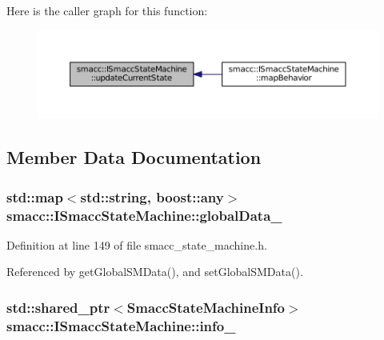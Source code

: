 Here is the caller graph for this function\+:
\nopagebreak
\begin{figure}[H]
\begin{center}
\leavevmode
\includegraphics[width=350pt]{classsmacc_1_1ISmaccStateMachine_aea0936b00b0186e8d4e514af16f69766_icgraph}
\end{center}
\end{figure}




\subsection{Member Data Documentation}
\subsubsection[{\texorpdfstring{global\+Data\+\_\+}{globalData_}}]{\setlength{\rightskip}{0pt plus 5cm}std\+::map$<$std\+::string, boost\+::any$>$ smacc\+::\+I\+Smacc\+State\+Machine\+::global\+Data\+\_\+\hspace{0.3cm}{\ttfamily [private]}}\hypertarget{classsmacc_1_1ISmaccStateMachine_a4af5edfc2584f74409ca194d2d869fac}{}\label{classsmacc_1_1ISmaccStateMachine_a4af5edfc2584f74409ca194d2d869fac}


Definition at line 149 of file smacc\+\_\+state\+\_\+machine.\+h.



Referenced by get\+Global\+S\+M\+Data(), and set\+Global\+S\+M\+Data().

\subsubsection[{\texorpdfstring{info\+\_\+}{info_}}]{\setlength{\rightskip}{0pt plus 5cm}std\+::shared\+\_\+ptr$<${\bf Smacc\+State\+Machine\+Info}$>$ smacc\+::\+I\+Smacc\+State\+Machine\+::info\+\_\+}\hypertarget{classsmacc_1_1ISmaccStateMachine_a5ec3201cbddab4f062f572fb33021041}{}\label{classsmacc_1_1ISmaccStateMachine_a5ec3201cbddab4f062f572fb33021041}


